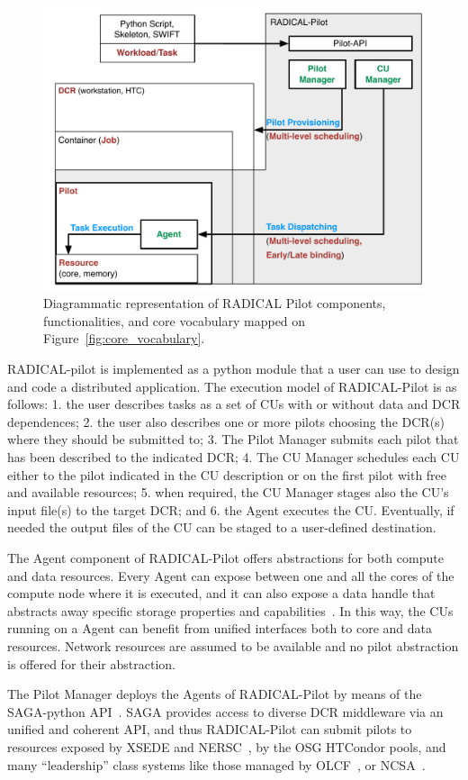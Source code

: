 \documentclass{sig-alternate}
\begin{document}
\begin{figure}[t]
    \centering
        \includegraphics[width=.48\textwidth]{figures/radicalp_comparison.pdf}
    \caption{Diagrammatic representation of RADICAL Pilot components,
    functionalities, and core vocabulary mapped on
    Figure~\ref{fig:core_vocabulary}.}
    \label{fig:rp_comparison}
\end{figure}

RADICAL-pilot is implemented as a python module that a user can use to design
and code a distributed application. The execution model of RADICAL-Pilot is as
follows: 1. the user describes tasks as a set of CUs with or without data and
DCR dependences; 2. the user also describes one or more pilots choosing the
DCR(s) where they should be submitted to; 3. The Pilot Manager submits each
pilot that has been described to the indicated DCR; 4. The CU Manager schedules
each CU either to the pilot indicated in the CU description or on the first
pilot with free and available resources; 5. when required, the CU Manager stages
also the CU's input file(s) to the target DCR; and 6. the Agent executes the CU.
Eventually, if needed the output files of the CU can be staged to a user-defined
destination.



The Agent component of RADICAL-Pilot offers abstractions for both compute and
data resources. Every Agent can expose between one and all the cores of the
compute node where it is executed, and it can also expose a data handle that
abstracts away specific storage properties and capabilities~\cite{luckow2010}.
In this way, the CUs running on a Agent can benefit from unified interfaces both
to core and data resources. Network resources are assumed to be available and no
pilot abstraction is offered for their abstraction.

The Pilot Manager deploys the Agents of RADICAL-Pilot by means of the
SAGA-python API~\cite{merzky2015saga}. SAGA provides access to diverse DCR
middleware via an unified and coherent API, and thus RADICAL-Pilot can submit
pilots to resources exposed by XSEDE and NERSC~\cite{nersc_url}, by the OSG
HTCondor pools, and many ``leadership'' class systems like those managed by
OLCF~\cite{olcf_url}, or NCSA~\cite{ncsa_url}.
\end{document}
